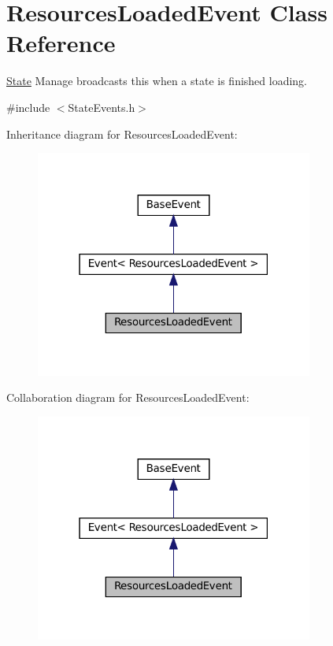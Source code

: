 \hypertarget{classResourcesLoadedEvent}{}\section{Resources\+Loaded\+Event Class Reference}
\label{classResourcesLoadedEvent}


\hyperlink{classState}{State} Manage broadcasts this when a state is finished loading.  




{\ttfamily \#include $<$State\+Events.\+h$>$}



Inheritance diagram for Resources\+Loaded\+Event\+:
\nopagebreak
\begin{figure}[H]
\begin{center}
\leavevmode
\includegraphics[width=259pt]{classResourcesLoadedEvent__inherit__graph}
\end{center}
\end{figure}


Collaboration diagram for Resources\+Loaded\+Event\+:
\nopagebreak
\begin{figure}[H]
\begin{center}
\leavevmode
\includegraphics[width=259pt]{classResourcesLoadedEvent__coll__graph}
\end{center}
\end{figure}

